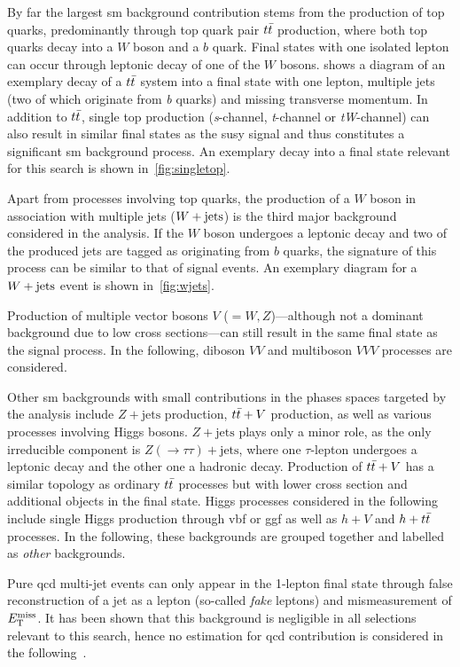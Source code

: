 By far the largest \gls{sm} background contribution stems from the production of top quarks, predominantly through top quark pair $t\bar{t}$ production, where both top quarks decay into a $W$ boson and a $b$ quark. Final states with one isolated lepton can occur through leptonic decay of one of the $W$ bosons.  shows a diagram of an exemplary decay of a $t\bar{t}$ system into a final state with one lepton, multiple jets (two of which originate from \textit{b} quarks) and missing transverse momentum. In addition to $t\bar{t}$, single top production (\textit{s}-channel, \textit{t}-channel or \textit{tW}-channel) can also result in similar final states as the \gls{susy} signal and thus constitutes a significant \gls{sm} background process. An exemplary decay into a final state relevant for this search is shown in~\cref{fig:singletop}.

Apart from processes involving top quarks, the production of a $W$ boson in association with multiple jets ($W+\mathrm{jets}$) is the third major background considered in the analysis. If the $W$ boson undergoes a leptonic decay and two of the produced jets are tagged as originating from $b$ quarks, the signature of this process can be similar to that of signal events. An exemplary diagram for a $W+\mathrm{jets}$ event is shown in~\cref{fig:wjets}. 

Production of multiple vector bosons $V$ ($=W,Z$)---although not a dominant background due to low cross sections---can still result in the same final state as the signal process. In the following, diboson $VV$ and multiboson $VVV$ processes are considered.

Other \gls{sm} backgrounds with small contributions in the phases spaces targeted by the analysis include $Z+\mathrm{jets}$ production, $t\bar{t}+V$ production, as well as various processes involving Higgs bosons. $Z+\mathrm{jets}$ plays only a minor role, as the only irreducible component is $Z(\rightarrow\tau\tau)+\mathrm{jets}$, where one $\tau$-lepton undergoes a leptonic decay and the other one a hadronic decay. Production of $t\bar{t}+V$ has a similar topology as ordinary $t\bar{t}$ processes but with lower cross section and additional objects in the final state. Higgs processes considered in the following include single Higgs production through \gls{vbf} or \gls{ggf} as well as $h+V$ and $h+t\bar{t}$ processes. In the following, these backgrounds are grouped together and labelled as \textit{other} backgrounds. 

Pure \gls{qcd} multi-jet events can only appear in the 1-lepton final state through false reconstruction of a jet as a lepton (so-called \textit{fake} leptons) and mismeasurement of $E_{\textrm{T}}^{\textrm{miss}}$. It has been shown that this background is negligible in all selections relevant to this search, hence no estimation for \gls{qcd} contribution is considered in the following~\cite{SUSY-2019-08}.

